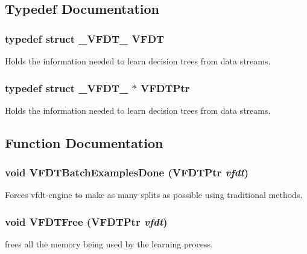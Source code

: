 \subsection{Typedef Documentation}
\subsubsection{\setlength{\rightskip}{0pt plus 5cm}typedef struct {\bf \_\-VFDT\_\-}  {\bf VFDT}}\label{vfdt-engine_8h_a2}


Holds the information needed to learn decision trees from data streams. 

\subsubsection{\setlength{\rightskip}{0pt plus 5cm}typedef struct {\bf \_\-VFDT\_\-} $\ast$ {\bf VFDTPtr}}\label{vfdt-engine_8h_a3}


Holds the information needed to learn decision trees from data streams. 



\subsection{Function Documentation}
\subsubsection{\setlength{\rightskip}{0pt plus 5cm}void VFDTBatch\-Examples\-Done ({\bf VFDTPtr} {\em vfdt})}\label{vfdt-engine_8h_a18}


Forces vfdt-engine to make as many splits as possible using traditional methods. 

\subsubsection{\setlength{\rightskip}{0pt plus 5cm}void VFDTFree ({\bf VFDTPtr} {\em vfdt})}\label{vfdt-engine_8h_a5}


frees all the memory being used by the learning process. 

